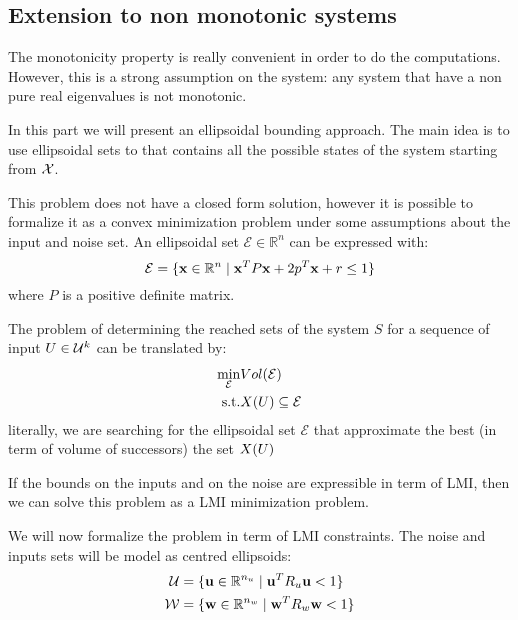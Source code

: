 
\subsection{Extension to non monotonic systems}
The monotonicity property is really convenient in order to do the computations.
However, this is a strong assumption on the system: any system that have a non pure real eigenvalues is not monotonic.

In this part we will present an ellipsoidal bounding approach.
The main idea is to use ellipsoidal sets to that contains all the possible states of the system starting from $\mathcal{X}$.

\newcommand{\ellipse}{\mathcal{E}}%
This problem does not have a closed form solution, however it is possible to formalize it as a convex minimization problem under some assumptions about the input and noise set.
An ellipsoidal set $\ellipse \in \mathbb{R}^n$ can be expressed with:
\begin{equation}
\ellipse  = \{\x \in \mathbb{R}^n \mid \x^T P \x + 2 p^T \x + r \leq 1 \} 
\end{equation}
where $P$ is a positive definite matrix.

The problem of determining the reached sets of the system $S$ for a sequence of input $U \in \mathcal{U}^k$ can be translated by:
\begin{equation} \label{min_prob}
\begin{aligned}
\min_{\ellipse} & Vol(\ellipse)\\
\textrm{s.t.}   & \X(U) \subseteq \ellipse
\end{aligned}
\end{equation}
literally, we are searching for the ellipsoidal set $\ellipse$ that approximate the best (in term of volume of successors) the set $X(U)$

If the bounds on the inputs and on the noise are expressible in term of LMI, then we can solve this problem as a LMI minimization problem.

We will now formalize the problem in term of LMI constraints.
The noise and inputs sets will be model as centred ellipsoids:
\begin{equation}
\begin{aligned}
\mathcal{U} &= \{  \mathbf{u} \in \mathbb{R}^{n_u} \mid  \mathbf{u}^T R_u  \mathbf{u} < 1 \}\\
\mathcal{W} &= \{  \mathbf{w} \in \mathbb{R}^{n_w} \mid  \mathbf{w}^T R_w  \mathbf{w} < 1 \}\\
\end{aligned}
\end{equation}

